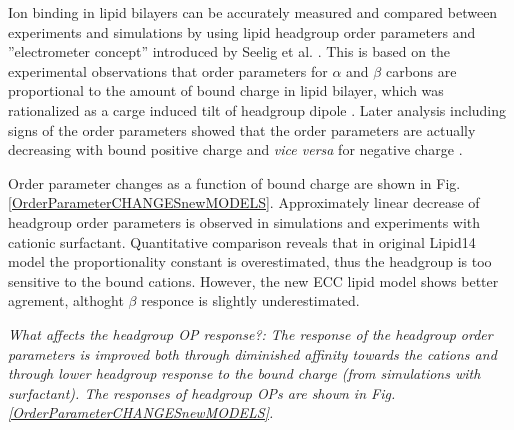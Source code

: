 \documentclass[aip,jcp,twocolumn]{revtex4}
\begin{document}

Ion binding in lipid bilayers can be accurately measured and compared
between experiments and simulations by using lipid headgroup order
parameters and ''electrometer concept'' introduced by Seelig et al. \cite{seelig87,catte16}.
This is based on the experimental observations that order parameters
for $\alpha$ and $\beta$ carbons are proportional to the amount of bound charge
in lipid bilayer, which was rationalized as a carge induced tilt
of headgroup dipole \cite{seelig87}. Later analysis including signs of the order
parameters showed that the order parameters are actually decreasing with bound
positive charge and {\it vice versa} for negative charge \cite{ollila16,catte16}.

Order parameter changes as a function of bound charge are shown in
Fig. \ref{OrderParameterCHANGESnewMODELS}. Approximately linear
decrease of headgroup order parameters is observed in simulations and
experiments with cationic surfactant. Quantitative comparison reveals
that in original Lipid14 model the proportionality constant is
overestimated, thus the headgroup is too sensitive to the bound cations.
However, the new ECC lipid model shows better agrement, althoght
$\beta$ responce is slightly underestimated.

{\it What affects the headgroup OP response?: The response of the headgroup order parameters is improved
both through diminished affinity towards the cations and through lower headgroup response to the bound charge
(from simulations with  surfactant). 
The responses of headgroup OPs are shown in Fig. \ref{OrderParameterCHANGESnewMODELS}. }


\end{document}
